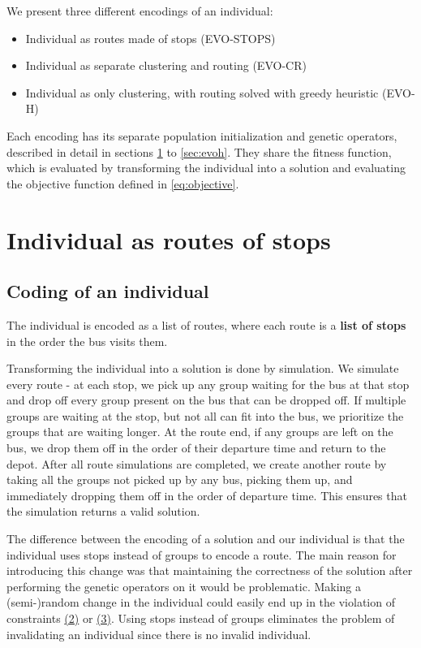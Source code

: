 \hspace{0pt}

We present three different encodings of an individual:

\begin{itemize}
    \item Individual as routes made of stops (EVO-STOPS)
    \item Individual as separate clustering and routing (EVO-CR)
    \item Individual as only clustering, with routing solved with greedy heuristic (EVO-H)
\end{itemize}

Each encoding has its separate population initialization and genetic operators, described in detail in sections \ref{sec:evo-stops} to \ref{sec:evoh}. They share the fitness function, which is evaluated by transforming the individual into a solution and evaluating the objective function defined in \ref{eq:objective}.

\section{Individual as routes of stops}\label{sec:evo-stops}

\subsection{Coding of an individual}

The individual is encoded as a list of routes, where each route is a \textbf{list of stops} in the order the bus visits them.

Transforming the individual into a solution is done by simulation.  We simulate every route - at each stop, we pick up any group waiting for the bus at that stop and drop off every group present on the bus that can be dropped off. If multiple groups are waiting at the stop, but not all can fit into the bus, we prioritize the groups that are waiting longer. At the route end, if any groups are left on the bus, we drop them off in the order of their departure time and return to the depot. After all route simulations are completed, we create another route by taking all the groups not picked up by any bus, picking them up, and immediately dropping them off in the order of departure time. This ensures that the simulation returns a valid solution.

The difference between the encoding of a solution and our individual is that the individual uses stops instead of groups to encode a route. The main reason for introducing this change was that maintaining the correctness of the solution after performing the genetic operators on it would be problematic. Making a (semi-)random change in the individual could easily end up in the violation of constraints \hyperref[constraints]{(2)} or \hyperref[constraints]{(3)}. Using stops instead of groups eliminates the problem of invalidating an individual since there is no invalid individual.

